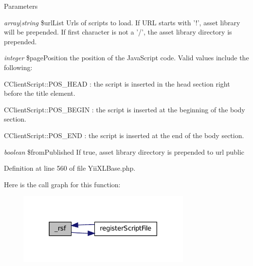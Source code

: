 \begin{DoxyParams}{Parameters}
\item[{\em array$|$string}]\$urlList Urls of scripts to load. If URL starts with '!', asset library will be prepended. If first character is not a '/', the asset library directory is prepended. \item[{\em integer}]\$pagePosition the position of the JavaScript code. Valid values include the following: 
\begin{DoxyItemize}
\item CClientScript::POS\_\-HEAD : the script is inserted in the head section right before the title element. 
\item CClientScript::POS\_\-BEGIN : the script is inserted at the beginning of the body section. 
\item CClientScript::POS\_\-END : the script is inserted at the end of the body section. 
\end{DoxyItemize}\item[{\em boolean}]\$fromPublished If true, asset library directory is prepended to url  public \end{DoxyParams}


Definition at line 560 of file YiiXLBase.php.








Here is the call graph for this function:\nopagebreak
\begin{figure}[H]
\begin{center}
\leavevmode
\includegraphics[width=246pt]{classYiiXLBase_ae5089c4caea1197b2462a18eda83ca8c_cgraph}
\end{center}
\end{figure}




